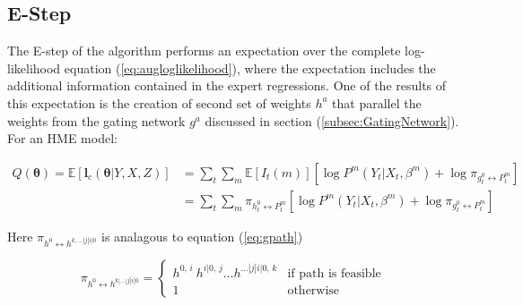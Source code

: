 \documentclass[12pt]{article}
\newcommand{\gateprod}[2]{\pi_{#1 \longleftrightarrow #2}}
\begin{document}


\subsection{E-Step}
The E-step of the algorithm performs an expectation over the complete
log-likelihood equation (\ref{eq:augloglikelihood}), where the expectation
includes the additional information contained in the expert regressions.
One of the results of this expectation is the creation of second set of
weights $h^{a}$ that parallel the weights from the gating network $g^{a}$
discussed in section (\ref{subsec:GatingNetwork}). For an HME model:

\begin{equation} \label{eq:Estep}
  \begin{split}
  Q(\boldsymbol{\theta}) = \mathbb{E} \left [ \boldsymbol{l}_{c}(\boldsymbol{\theta}|Y,X,Z) \right] & = \sum_{t}\sum_{m} \mathbb{E} \left[ I_{t}(m) \right] \left[ \log P^{m}(Y_{t}|X_{t}, \beta^{m}) + \log \gateprod{g^{0}_{t}}{P^{m}_{t}} \right] \\ 
   & = \sum_{t} \sum_{m} \gateprod{h^{0}_{t}}{P^{m}_{t}} \left[ \log P^{m}(Y_{t}|X_{t},\beta^{m}) + \log \gateprod{g^{0}_{t}}{P^{m}_{t}} \right]
 \end{split}
\end{equation}

Here $\gateprod{h^{0}}{h^{k,\dots|j|i|0}}$ is analagous to equation (\ref{eq:gpath})

\begin{equation} \label{eq:hpath}
  \gateprod{h^{0}}{h^{k|\ldots|j|i|0}} =
    \begin{cases} 
       h^{0, \, i} \ h^{i|0, \, j} \ldots h^{\dots|j|i|0, \, k} & \textrm{if path is feasible} \\
       1 & \textrm{otherwise}
    \end{cases}
\end{equation}
\end{document}
